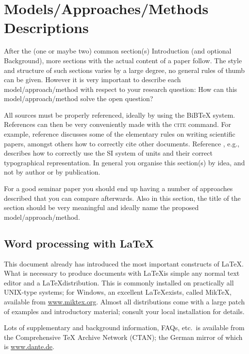 \documentclass[12pt,twoside]{article}
\theoremstyle{plain}
\theoremstyle{definition}
\theoremstyle{remark}
\begin{document}
\section{Models/Approaches/Methods Descriptions}
\label{sec:model}

After the (one or maybe two) common section(s) Introduction (and optional Background), more sections with the actual content of a paper follow. The style and structure of such sections varies by a large degree, no general rules of thumb can be given. However it is very important to describe each model/approach/method with respect to your research question: How can this model/approach/method solve the open question? 

All sources must be properly referenced, ideally by using the BiBTeX system. References can then be very conveniently made with the \textsc{cite} command. For example, reference
\cite{Leunen:Scholars:92} discusses some of the elementary rules on writing scientific papers, amongst others how to correctly cite other documents. Reference \cite{Taylor:SIGuide:95}, e.g., describes how to correctly use the SI system of units and their correct typographical
representation. In general you organise this section(s) by idea, and not by author or by publication.

For a good seminar paper you should end up having a number of approaches described that you can compare afterwards. Also in this section, the title of the section should be very meaningful and ideally name the proposed model/approach/method.

\subsection{Word processing with \LaTeX}
\label{sec:model:subsec:latex}

This document already has introduced the most important constructs of \LaTeX. What is necessary to produce documents with \LaTeX is simple any normal text editor and a \LaTeX distribution. This is commonly installed on practically all UNIX-type systems; for Windows, an
excellent \LaTeX exists, called MikTeX, available from \url{www.miktex.org}. Almost all distributions come with a large patch of examples and introductory material; consult your local installation for details. 

Lots of supplementary and background information, FAQs, etc.\ is available from the Comprehensive TeX Archive Network (CTAN); the German mirror of which is \url{www.dante.de}. 
\end{document}
